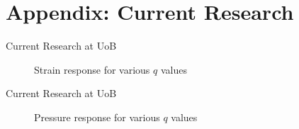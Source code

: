 \documentclass[aspectratio=169]{beamer}            %
\begin{document}
\section[Current Research]{Appendix: Current Research}
\begin{frame}{Current Research at UoB}

  \begin{figure}[!htb]
    \centering
		
		\caption{Strain response for various ${q}$ values}
		\label{fig:PressureResponse2q}
  \end{figure}

\end{frame}

\begin{frame}{Current Research at UoB}

  \begin{figure}[!htb]
    \centering
		
		\caption{Pressure response for various ${q}$ values}
		\label{fig:Pressure
		Response2q}
  \end{figure}

\end{frame}

\end{document}
